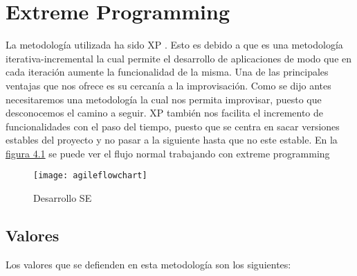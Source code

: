\section{Extreme Programming}

La metodología utilizada ha sido \acf{XP} \cite{XP}. Esto es debido a que es una
metodología iterativa-incremental la cual permite el desarrollo de aplicaciones de modo que en cada
iteración aumente la funcionalidad de la misma. Una de las principales ventajas que nos ofrece
es su cercanía a la improvisación. Como se dijo antes necesitaremos una metodología la cual
nos permita improvisar, puesto que desconocemos el camino a seguir. \acs{XP} también nos facilita
el incremento de funcionalidades con el paso del tiempo, puesto que se centra en sacar versiones
estables del proyecto y no pasar a la siguiente hasta que no este estable. En la \hyperref[fig:Desarrollo Sistema Experto]{figura 4.1} se
puede ver el flujo normal trabajando con extreme programming


\begin{figure}[htb]
  \centering
    \texttt{[image: agileflowchart]}
  \caption[Desarrollo SE]{Desarrollo SE}
  \label{fig:Desarrollo Sistema Experto}
\end{figure}



\subsection{Valores}

Los valores que se defienden en esta metodología son los siguientes:

